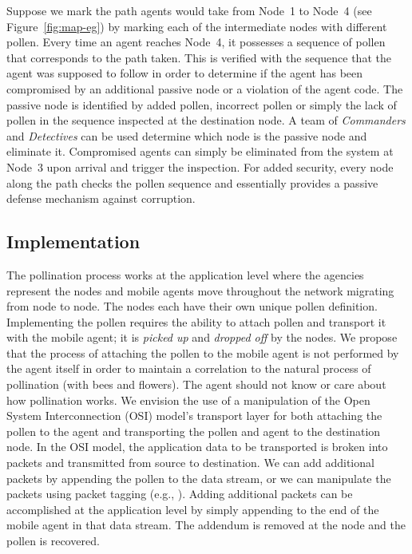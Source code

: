 \documentclass{acm_proc_article-sp}
\begin{document}
Suppose we mark the path agents would take from Node~1 to Node~4 (see Figure~\ref{fig:map-eg}) by marking each of the intermediate nodes with different pollen.  Every time an agent reaches Node~4, it possesses a sequence of pollen that corresponds to the path taken.  This is verified with the sequence that the agent was supposed to follow in order to determine if the agent has been compromised by an additional passive node or a violation of the agent code.  The passive node is identified by added pollen, incorrect pollen or simply the lack of pollen in the sequence inspected at the destination node.  A team of {\it Commanders} and {\it Detectives} can be used determine which node is the passive node and eliminate it.  Compromised agents can simply be eliminated from the system at Node~3 upon arrival and trigger the inspection.  For added security, every node along the path checks the pollen sequence and essentially provides a passive defense mechanism against corruption.

\subsection{Implementation}
The pollination process works at the application level where the agencies represent the nodes and mobile agents move throughout the network migrating from node to node.  The nodes each have their own unique pollen definition.  Implementing the pollen requires the ability to attach pollen and transport it with the mobile agent; it is {\it picked up} and {\it dropped off} by the nodes.  We propose that the process of attaching the pollen to the mobile agent is not performed by the agent itself in order to maintain a correlation to the natural process of pollination (with bees and flowers).  The agent should not know or care about how pollination works.  We envision the use of a manipulation of the Open System Interconnection (OSI) \cite{wetteroth01} model's transport layer for both attaching the pollen to the agent and transporting the pollen and agent to the destination node.  In the OSI model, the application data to be transported is broken into packets and transmitted from source to destination.  We can add additional packets by appending the pollen to the data stream, or we can manipulate the packets using packet tagging (e.g., \cite{belenky03, djemaiel07}).  Adding additional packets can be accomplished at the application level by simply appending to the end of the mobile agent in that data stream.  The addendum is removed at the node and the pollen is recovered.
\end{document}
